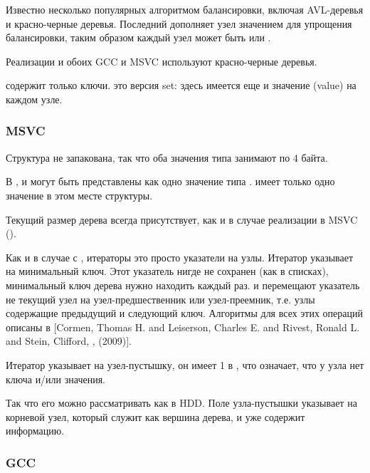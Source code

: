 Известно несколько популярных алгоритмом балансировки, включая AVL-деревья и красно-черные деревья.
Последний дополняет узел значением  для упрощения балансировки, таким образом каждый узел может быть
 или .

Реализации  и  обоих GCC и MSVC используют красно-черные деревья.

 содержит только ключи.
 это  версия set: здесь имеется еще и значение (value) на каждом узле.

\subsubsection{MSVC}





Структура не запакована, так что оба значения типа \Tchar занимают по 4 байта.

В ,  и  могут быть представлены как одно значение типа .
 имеет только одно значение в этом месте структуры.

Текущий размер дерева всегда присутствует, как и в случае реализации  в MSVC ().

Как и в случае с , итераторы это просто указатели на узлы.
Итератор  указывает на минимальный ключ.
Этот указатель нигде не сохранен (как в списках), минимальный ключ дерева нужно находить каждый раз.
 и  перемещают указатель не текущий узел на узел-предшественник
или узел-преемник, т.е. узлы содержащие предыдущий и следующий ключ.
Алгоритмы для всех этих операций описаны в
[Cormen, Thomas H. and Leiserson, Charles E. and Rivest, Ronald L. and Stein, Clifford,
, (2009)].

Итератор  указывает на узел-пустышку, он имеет 1 в , что означает, что у узла
нет ключа и/или значения.

Так что его можно рассматривать как  в \ac{HDD}.
Поле  узла-пустышки указывает на корневой узел, который служит
как вершина дерева, и уже содержит информацию.

\subsubsection{GCC}

